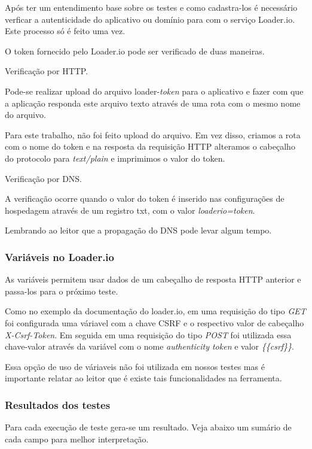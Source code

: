   Após ter um entendimento base sobre os testes e como cadastra-los é necessário verficar a autenticidade do 
  aplicativo ou domínio para com o serviço Loader.io. Este processo só é feito uma vez. 
  
  O token fornecido pelo Loader.io pode ser verificado de duas maneiras.
  
  Verificação por HTTP.
  
  Pode-se realizar upload do arquivo loader-\textit{token} para o aplicativo e fazer com que a aplicação
  responda este arquivo texto através de uma rota com o mesmo nome do arquivo. 
  
  Para este trabalho, não foi feito upload do arquivo. Em vez disso, criamos a rota com o nome do token e
  na resposta da requisição \ac{HTTP} alteramos o cabeçalho do protocolo para \textit{text/plain} e imprimimos
  o valor do token.
  
  Verificação por DNS.
  
  A verificação ocorre quando o valor do token é inserido nas configurações de hospedagem através de um
  registro txt, com o valor \textit{loaderio=token}.
  
  Lembrando ao leitor que a propagação do \ac{DNS} pode levar algum tempo.
  
\subsubsection{Variáveis no Loader.io}

  As variáveis permitem usar dados de um cabeçalho de resposta \ac{HTTP} anterior e passa-los para o próximo
  teste.
  
  Como no exemplo da documentação do loader.io, em uma requisição do tipo \textit{GET} foi configurada uma váriavel
  com a chave \ac{CSRF} e o respectivo valor de cabeçalho \textit{X-Csrf-Token}. Em seguida em uma requisição 
  do tipo \textit{POST} foi utilizada essa chave-valor através da variável com o nome \textit{authenticity token} e valor
  \textit{\{\{csrf\}\}}.
  
  Essa opção de uso de váriaveis não foi utilizada em nossos testes mas é importante relatar ao leitor que
  é existe tais funcionalidades na ferramenta.

  
\subsubsection{Resultados dos testes}

  Para cada execução de teste gera-se um resultado. Veja abaixo um sumário de cada campo para melhor interpretação.
  
